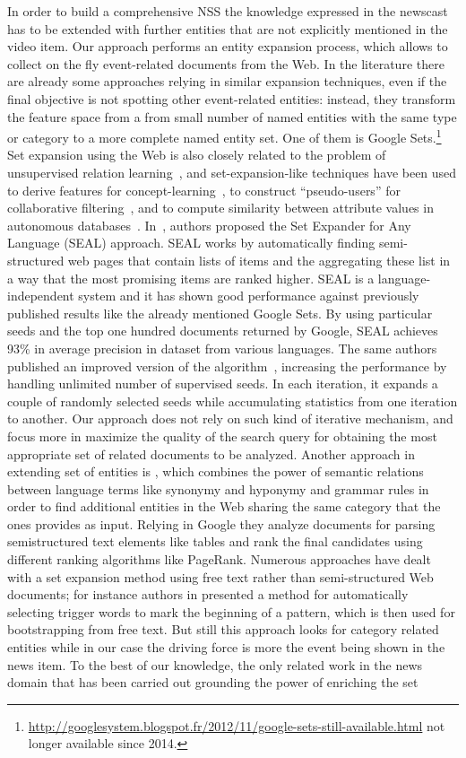 \documentclass{llncs}
\begin{document}
In order to build a comprehensive NSS the knowledge expressed in the newscast has to be extended with further entities that are not explicitly mentioned in the video item. Our approach performs an entity expansion process, which allows to collect on the fly event-related documents from the Web. In the literature there are already some approaches relying in similar expansion techniques, even if the final objective is not spotting other event-related entities: instead, they transform the feature space from a from small number of named entities with the same type or category to a more complete named entity set. One of them is Google Sets.\footnote{\url{http://googlesystem.blogspot.fr/2012/11/google-sets-still-available.html} not longer available since 2014.} Set expansion using the Web is also closely related to the problem of unsupervised relation learning~\cite{Cafarella2005}, and set-expansion-like techniques have been used to derive features for concept-learning~\cite{Cohen2000}, to construct ``pseudo-users'' for collaborative filtering~\cite{Cohen99}, and to compute similarity between attribute values in autonomous databases~\cite{Wolf2007}. In~\cite{Wang2007}, authors proposed the Set Expander for Any Language (SEAL) approach. SEAL works by automatically finding semi-structured web pages that contain lists of items and the aggregating these list in a way that the most promising items are ranked higher. SEAL is a language-independent system and it has shown good performance against previously published results like the already mentioned Google Sets. By using particular seeds and the top one hundred documents returned by Google, SEAL achieves 93\% in average precision in dataset from various languages. The same authors published an improved version of the algorithm~\cite{Wang2008}, increasing the performance by handling unlimited number of supervised seeds. In each iteration, it expands a couple of randomly selected seeds while accumulating statistics from one iteration to another. Our approach does not rely on such kind of iterative mechanism, and focus more in maximize the quality of the search query for obtaining the most appropriate set of related documents to be analyzed. Another approach in extending set of entities is \cite{Mai-Vu2010}, which combines the power of semantic relations between language terms like synonymy and hyponymy and grammar rules in order to find additional entities in the Web sharing the same category that the ones provides as input. Relying in Google they analyze documents for parsing semistructured text elements like tables and rank the final candidates using different ranking algorithms like PageRank. Numerous approaches have dealt with a set expansion method using free text rather than semi-structured Web documents; for instance authors in \cite{Talukdar2006} presented a method for automatically selecting trigger words to mark the beginning of a pattern, which is then used for bootstrapping from free text. But still this approach looks for category related entities while in our case the driving force is more the event being shown in the news item. To the best of our knowledge, the only related work in the news domain that has been carried out grounding the power of enriching the set 
\end{document}
